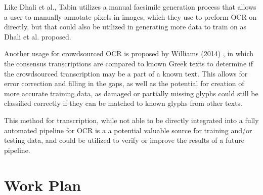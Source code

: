 \documentclass[12pt,a4paper,final]{article}
\begin{document}
Like Dhali et al.\cite{Dhali2019}, Tabin\cite{Tabin} utilizes a manual facsimile generation process that allows a user to manually annotate pixels in images, which they use to preform OCR on directly, but that could also be utilized in generating more data to train on as Dhali et al.\cite{Dhali2019} proposed.

Another usage for crowdsourced OCR is proposed by Williams (2014) \cite{Williams2014}, in which the consensus transcriptions are compared to known Greek texts to determine if the crowdsourced transcription may be a part of a known text. This allows for error correction and filling in the gaps, as well as the potential for creation of more accurate training data, as damaged or partially missing glyphs could still be classified correctly if they can be matched to known glyphs from other texts.

This method for transcription, while not able to be directly integrated into a fully automated pipeline for OCR is a a potential valuable source for training and/or testing data, and could be utilized to verify or improve the results of a future pipeline.

\newpage
\section{Work Plan}
\todo{}

\printbibliography[heading=bibintoc, title={References}]
\end{document}

